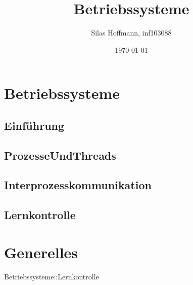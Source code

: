 \documentclass{article}
\title{Betriebssysteme}
\author{Silas Hoffmann, inf103088}
\date{\today}
\begin{document}
\maketitle
\vspace{0.5cm}
\tableofcontents
\clearpage

\section{Betriebssysteme}
\subsection{Einführung}\subsection{ProzesseUndThreads}\subsection{Interprozesskommunikation}\subsection{Lernkontrolle}%
\section{Generelles}
\begin{tcolorbox}[colback=white!10!white,colframe=lightgray!75!black,
  savelowerto=\jobname_ex.tex,breakable,enhanced,lines before break=40]

\begin{center}
Betriebssysteme::Lernkontrolle

\end{center}

\tcblower

\justifying

\end{tcolorbox}
\end{document}
